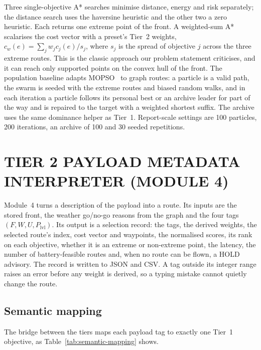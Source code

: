 Three single-objective A* searches minimise distance, energy and risk separately; the
distance search uses the haversine heuristic and the other two a zero heuristic. Each
returns one extreme point of the front. A weighted-sum A* scalarises the cost vector
with a preset's Tier~2 weights, $c_w(e) = \sum_j w_j c_j(e)/s_j$, where $s_j$ is the
spread of objective $j$ across the three extreme routes. This is the classic approach
our problem statement criticises, and it can reach only supported points on the convex
hull of the front. The population baseline adapts MOPSO~\cite{r6} to graph routes: a
particle is a valid path, the swarm is seeded with the extreme routes and biased random
walks, and in each iteration a particle follows its personal best or an archive leader
for part of the way and is repaired to the target with a weighted shortest suffix. The
archive uses the same dominance helper as Tier~1. Report-scale settings are 100
particles, 200 iterations, an archive of 100 and 30 seeded repetitions.

\section{TIER 2 PAYLOAD METADATA INTERPRETER (MODULE 4)}\label{sec:m4}

Module~4 turns a description of the payload into a route. Its inputs are the stored
front, the weather go/no-go reasons from the graph and the four tags
$(F, W, U, P_\mathrm{lvl})$. Its output is a selection record: the tags, the derived
weights, the selected route's index, cost vector and waypoints, the normalised scores,
its rank on each objective, whether it is an extreme or non-extreme point, the latency,
the number of battery-feasible routes and, when no route can be flown, a HOLD advisory.
The record is written to JSON and CSV. A tag outside its integer range raises an error
before any weight is derived, so a typing mistake cannot quietly change the route.

\subsection{Semantic mapping}

The bridge between the tiers maps each payload tag to exactly one Tier~1 objective, as
Table~\ref{tab:semantic-mapping} shows.


